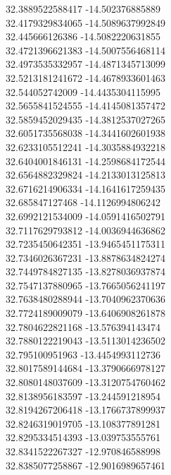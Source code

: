 {32.3889522588417	-14.502376885889\\
32.4179329834065	-14.5089637992849\\
32.445666126386	-14.5082220631855\\
32.4721396621383	-14.5007556468114\\
32.4973535332957	-14.4871345713099\\
32.5213181241672	-14.4678933601463\\
32.544052742009	-14.4435304115995\\
32.5655841524555	-14.4145081357472\\
32.5859452029435	-14.3812537027265\\
32.6051735568038	-14.3441602601938\\
32.6233105512241	-14.3035884932218\\
32.6404001846131	-14.2598684172544\\
32.6564882329824	-14.2133013125813\\
32.6716214906334	-14.1641617259435\\
32.685847127468	-14.1126994806242\\
32.6992121534009	-14.0591416502791\\
32.7117629793812	-14.0036944636862\\
32.7235450642351	-13.9465451175311\\
32.7346026367231	-13.8878634824274\\
32.7449784827135	-13.8278036937874\\
32.7547137880965	-13.7665056241197\\
32.7638480288944	-13.7040962370636\\
32.7724189009079	-13.6406908261878\\
32.7804622821168	-13.576394143474\\
32.7880122219043	-13.5113014236502\\
32.795100951963	-13.4454993112736\\
32.8017589144684	-13.3790666978127\\
32.8080148037609	-13.3120754760462\\
32.8138956183597	-13.244591218954\\
32.8194267206418	-13.1766737899937\\
32.8246319019705	-13.108377891281\\
32.8295334514393	-13.039753555761\\
32.8341522267327	-12.970846588998\\
32.8385077258867	-12.9016989657461\\
}
